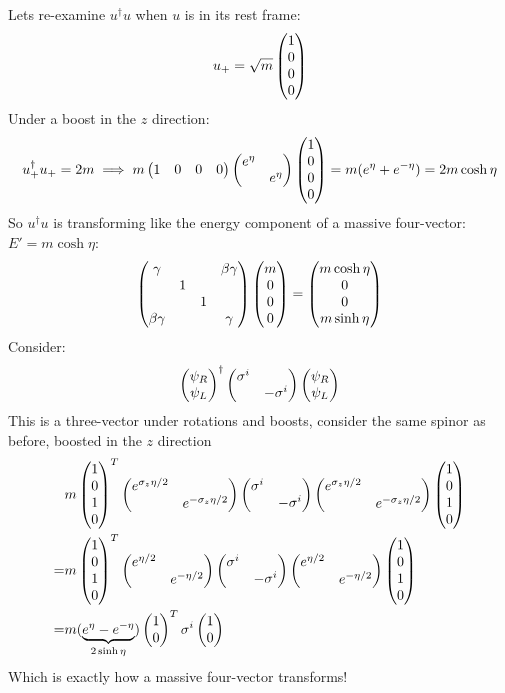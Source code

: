 Lets re-examine $u^\dag u$ when $u$ is in its rest frame:
\begin{align*}
  u_+=\sqrt{m}\pmqty{1\\0\\0\\0}
\end{align*}
Under a boost in the $z$ direction:
\begin{align*}
  u^\dag_+u_+=2m\implies m\pmqty{1&0&0&0}
  \pmqty{e^\eta\\&e^\eta}\pmqty{1\\0\\0\\0}=m(e^\eta+e^{-\eta})
  =2m\cosh\eta
\end{align*}
So $u^\dag u$ is transforming like the energy component of a massive four-vector: $E'=m\cosh\eta$:
\begin{align*}
  \pmqty{\gamma&&&\beta\gamma\\&1\\&&1\\\beta\gamma&&&\gamma}
  \pmqty{m\\0\\0\\0}=\pmqty{m\cosh\eta\\0\\0\\m\sinh\eta}
\end{align*}
Consider:
\begin{align*}
  \pmqty{\psi_R\\\psi_L}^\dag\pmqty{\sigma^i\\&-\sigma^i}\pmqty{\psi_R\\\psi_L}
\end{align*}
This is a three-vector under rotations and boosts, consider the same spinor as before, boosted in the $z$ direction
\begin{align*}
  &m\pmqty{1\\0\\1\\0}^T
  \pmqty{e^{\sigma_z\eta/2}\\&e^{-\sigma_z\eta/2}}
  \pmqty{\sigma^i\\&-\sigma^i}
  \pmqty{e^{\sigma_z\eta/2}\\&e^{-\sigma_z\eta/2}}
  \pmqty{1\\0\\1\\0}\\
  =&m\pmqty{1\\0\\1\\0}^T
  \pmqty{e^{\eta/2}\\&e^{-\eta/2}}
  \pmqty{\sigma^i\\&-\sigma^i}
  \pmqty{e^{\eta/2}\\&e^{-\eta/2}}
  \pmqty{1\\0\\1\\0}\\
  =&m(\underbrace{e^\eta-e^{-\eta}}_{2\sinh\eta})
  \pmqty{1\\0}^T\sigma^i\pmqty{1\\0}
\end{align*}
Which is exactly how a massive four-vector transforms!

